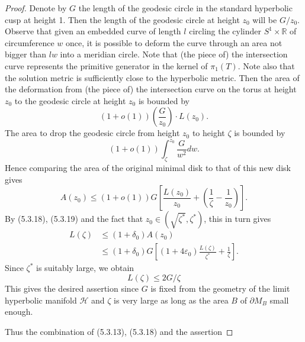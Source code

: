 \begin{proof}
Denote by $G$ the length of the geodesic circle in the standard
hyperbolic cusp at height 1. Then the length of the geodesic
circle at height $z_0$ will be $G/z_0$. Observe that given an
embedded curve of length $l$ circling the cylinder $S^1\times
\mathbb{R}$ of circumference $w$ once, it is possible to deform
the curve through an area not bigger than $lw$ into a meridian
circle. Note that (the piece of) the intersection curve represents
the primitive generator in the kernel of $\pi_1(T)$. Note also
that the solution metric is sufficiently close to the hyperbolic
metric. Then the area of the deformation from (the piece of) the
intersection curve on the torus at height $z_0$ to the geodesic
circle at height $z_0$ is bounded by
$$
(1+o(1))\left(\frac{G}{z_0}\right)\cdot L(z_0).
$$
The area to drop the geodesic circle from height $z_0$ to height
$\zeta$ is bounded by
$$
(1+o(1))\int_{\zeta}^{z_0}\frac{G}{w^2}dw.
$$
Hence comparing the area of the original minimal disk to that of
this new disk gives
$$
A(z_0)\leq (1+o(1))G\left[\frac{L(z_0)}{z_0}
+\left(\frac{1}{\zeta}-\frac{1}{z_0}\right)\right].
$$
By (5.3.18), (5.3.19) and the fact that
$z_0\in(\sqrt{\zeta^{\ast}},\zeta^{\ast})$, this in turn gives
\begin{align*}
L(\zeta)&  \leq (1+\delta_0)A(z_0) \\
&  \leq(1+\delta_0)G
\left[(1+4\varepsilon_0)\frac{L(\zeta)}{\zeta^{\ast}}+\frac{1}{\zeta}\right].
\end{align*}
Since $\zeta^{\ast}$ is suitably large, we obtain
$$
L(\zeta)\leq 2G/\zeta
$$
This gives the desired assertion since $G$ is fixed from the
geometry of the limit hyperbolic manifold $\mathcal{H}$ and
$\zeta$ is very large as long as the area $B$ of $\partial M_B$
small enough.

Thus the combination of (5.3.13), (5.3.18) and the assertion
\end{proof}
